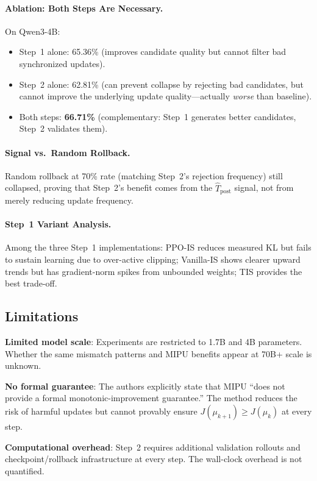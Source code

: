 \documentclass[11pt,a4paper]{article}
\begin{document}
\paragraph{Ablation: Both Steps Are Necessary.} On Qwen3-4B:
\begin{itemize}
\item Step~1 alone: 65.36\% (improves candidate quality but cannot filter bad synchronized updates).
\item Step~2 alone: 62.81\% (can prevent collapse by rejecting bad candidates, but cannot improve the underlying update quality---actually \emph{worse} than baseline).
\item Both steps: \textbf{66.71\%} (complementary: Step~1 generates better candidates, Step~2 validates them).
\end{itemize}

\paragraph{Signal vs.\ Random Rollback.} Random rollback at 70\% rate (matching Step~2's rejection frequency) still collapsed, proving that Step~2's benefit comes from the $\hat{T}_{\mathrm{post}}$ signal, not from merely reducing update frequency.

\paragraph{Step~1 Variant Analysis.} Among the three Step~1 implementations: PPO-IS reduces measured KL but fails to sustain learning due to over-active clipping; Vanilla-IS shows clearer upward trends but has gradient-norm spikes from unbounded weights; TIS provides the best trade-off.

\subsection{Limitations}

\textbf{Limited model scale}: Experiments are restricted to 1.7B and 4B parameters. Whether the same mismatch patterns and MIPU benefits appear at 70B+ scale is unknown.

\textbf{No formal guarantee}: The authors explicitly state that MIPU ``does not provide a formal monotonic-improvement guarantee.'' The method reduces the risk of harmful updates but cannot provably ensure $J(\mu_{k+1}) \geq J(\mu_k)$ at every step.

\textbf{Computational overhead}: Step~2 requires additional validation rollouts and checkpoint/rollback infrastructure at every step. The wall-clock overhead is not quantified.
\end{document}
